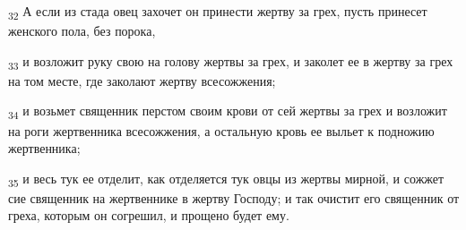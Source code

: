 \begin{tcolorbox}
\textsubscript{32} А если из стада овец захочет он принести жертву за грех, пусть принесет женского пола, без порока,
\end{tcolorbox}
\begin{tcolorbox}
\textsubscript{33} и возложит руку свою на голову жертвы за грех, и заколет ее в жертву за грех на том месте, где заколают жертву всесожжения;
\end{tcolorbox}
\begin{tcolorbox}
\textsubscript{34} и возьмет священник перстом своим крови от сей жертвы за грех и возложит на роги жертвенника всесожжения, а остальную кровь ее выльет к подножию жертвенника;
\end{tcolorbox}
\begin{tcolorbox}
\textsubscript{35} и весь тук ее отделит, как отделяется тук овцы из жертвы мирной, и сожжет сие священник на жертвеннике в жертву Господу; и так очистит его священник от греха, которым он согрешил, и прощено будет ему.
\end{tcolorbox}
